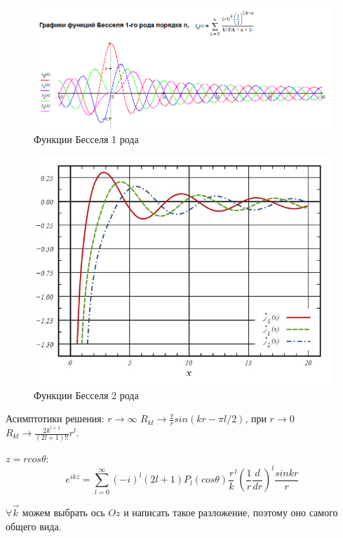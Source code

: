 \par \begin{figure} 
\vspace{-2ex}
\centering
\includegraphics[width=1\linewidth]{pictures/28.1.png}
\caption{Функции Бесселя 1 рода}
\end{figure}

\par \begin{figure} 
\vspace{-2ex}
\centering
\includegraphics[width=1\linewidth]{pictures/28.2.jpg}
\caption{Функции Бесселя 2 рода}
\end{figure}
\par Асимптотики решения: $r \rightarrow \infty$ $R_{kl}\rightarrow \frac{2}{r} sin (kr- \pi l/2) $, при $ r \rightarrow 0$ $R_{kl}\rightarrow \frac{2k^{l+1}}{(2l+1)!!} r^l $.
\par $z = r cos \theta$: 
$$e^{ikz}=\sum^\infty_{l=0}(-i)^l(2l+1)P_l (cos\theta) \frac{r}{k}^l \left(\frac{1}{r} \frac{d}{dr} \right)^l  \frac{sin kr}{r}$$
\par $\forall \vec{k}$ можем выбрать ось $Oz$ и написать такое разложение, поэтому оно самого общего вида.